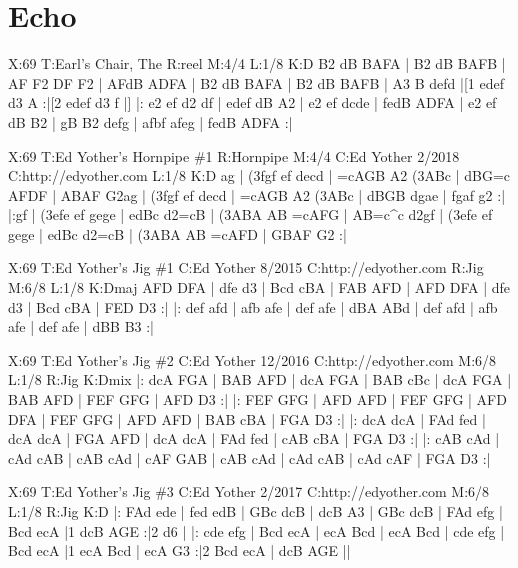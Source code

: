 \documentclass{article}
\begin{document}
\section{Echo}

\begin{abc}[name]
X:69
T:Earl's Chair, The
R:reel
M:4/4
L:1/8
K:D
B2 dB BAFA | B2 dB BAFB | AF F2 DF F2 | AFdB ADFA |
B2 dB BAFA | B2 dB BAFB | A3 B defd |[1 edef d3 A :|[2 edef d3 f |]
|: e2 ef d2 df | edef dB A2 | e2 ef dcde | fedB ADFA |
e2 ef dB B2 | gB B2 defg | afbf afeg | fedB ADFA :|
\end{abc}

\begin{abc}[name]
X:69
T:Ed Yother's Hornpipe \#1
R:Hornpipe
M:4/4
C:Ed Yother 2/2018
C:http://edyother.com
L:1/8
K:D
ag | (3fgf ef decd | =cAGB A2 (3ABc | dBG=c AFDF | ABAF G2ag |
(3fgf ef decd | =cAGB A2 (3ABc | dBGB dgae | fgaf g2 :|
|:gf | (3efe ef gege | edBc d2=cB | (3ABA AB =cAFG | AB=c^c d2gf |
(3efe ef gege | edBc d2=cB | (3ABA AB =cAFD | GBAF G2 :|
\end{abc}

\begin{abc}[name]
X:69
T:Ed Yother's Jig \#1
C:Ed Yother 8/2015
C:http://edyother.com
R:Jig
M:6/8
L:1/8
K:Dmaj
AFD DFA | dfe d3 | Bcd cBA | FAB AFD |
AFD DFA | dfe d3 | Bcd cBA | FED D3 :|
|: def afd | afb afe | def afe | dBA ABd |
def afd | afb afe | def afe | dBB B3 :|
\end{abc}

\begin{abc}[name]
X:69
T:Ed Yother's Jig \#2
C:Ed Yother 12/2016
C:http://edyother.com
M:6/8
L:1/8
R:Jig
K:Dmix
|: dcA FGA | BAB AFD | dcA FGA | BAB cBc |
dcA FGA | BAB AFD | FEF GFG | AFD D3 :|
|: FEF GFG | AFD AFD | FEF GFG | AFD DFA |
FEF GFG | AFD AFD | BAB cBA | FGA D3 :|
|: dcA dcA | FAd fed | dcA dcA | FGA AFD |
dcA dcA | FAd fed | cAB cBA | FGA D3 :|
|: cAB cAd | cAd cAB | cAB cAd | cAF GAB |
cAB cAd | cAd cAB | cAd cAF | FGA D3 :|
\end{abc}

\begin{abc}[name]
X:69
T:Ed Yother's Jig \#3
C:Ed Yother 2/2017
C:http://edyother.com
M:6/8
L:1/8
R:Jig
K:D
|: FAd ede | fed edB | GBc dcB | dcB A3 |
GBc dcB | FAd efg | Bcd ecA |1 dcB AGE :|2 d6 |
|: cde efg | Bcd ecA | ecA Bcd | ecA Bcd |
cde efg | Bcd ecA |1 ecA Bcd | ecA G3 :|2  Bcd ecA | dcB AGE ||
\end{abc}
\end{document}
